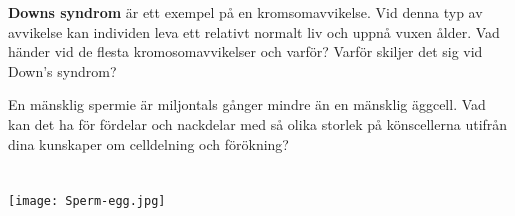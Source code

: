 \documentclass{exam}
\begin{document}
\begin{questions}
\break

\question
\textbf{Downs syndrom} är ett exempel på en kromsomavvikelse. Vid denna typ av avvikelse kan individen leva ett relativt normalt liv och uppnå vuxen ålder. Vad händer vid de flesta kromosomavvikelser och varför? Varför skiljer det sig vid Down's syndrom? 
\vspace{70mm}


\question
En mänsklig spermie är miljontals gånger mindre än en mänsklig äggcell. Vad kan det ha för fördelar och nackdelar med så olika storlek på könscellerna utifrån dina kunskaper om celldelning och förökning? 
\\ \\ \\
\texttt{[image: Sperm-egg.jpg]}





\end{questions}
\end{document}
